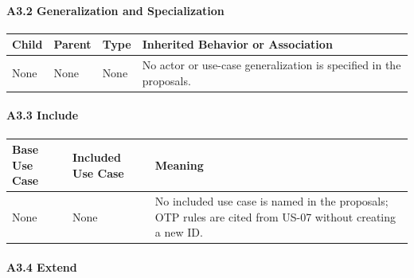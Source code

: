 \documentclass[12pt]{article}
\renewcommand{\baselinestretch}{1.5}
\begin{document}
\hypertarget{sec:a3-2-generalization-and-specialization}{}
\paragraph*{A3.2 Generalization and Specialization}
\par\medskip

\begingroup
\small
\renewcommand{\baselinestretch}{1.0}\selectfont
\renewcommand{\arraystretch}{1.15}
\setlength{\tabcolsep}{6pt}
\begin{longtable}{|>{\raggedright\arraybackslash}p{}|>{\raggedright\arraybackslash}p{}|>{\raggedright\arraybackslash}p{}|>{\raggedright\arraybackslash}p{}|}
\hline
\textbf{Child} & \textbf{Parent} & \textbf{Type} & \textbf{Inherited Behavior or Association} \\ \hline
\endhead
None & None & None & No actor or use-case generalization is specified in the proposals. \\ \hline
\end{longtable}
\endgroup
\par\medskip

\hypertarget{sec:a3-3-include}{}
\paragraph*{A3.3 Include}
\par\medskip

\begingroup
\small
\renewcommand{\baselinestretch}{1.0}\selectfont
\renewcommand{\arraystretch}{1.15}
\setlength{\tabcolsep}{6pt}
\begin{longtable}{|>{\raggedright\arraybackslash}p{}|>{\raggedright\arraybackslash}p{}|>{\raggedright\arraybackslash}p{}|}
\hline
\textbf{Base Use Case} & \textbf{Included Use Case} & \textbf{Meaning} \\ \hline
\endhead
None & None & No included use case is named in the proposals; OTP rules are cited from US-07 without creating a new ID. \\ \hline
\end{longtable}
\endgroup
\par\medskip

\hypertarget{sec:a3-4-extend}{}
\paragraph*{A3.4 Extend}
\par\medskip
\end{document}
